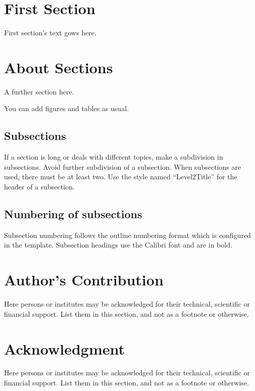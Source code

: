 \documentclass[article]{imeko_acta}
\begin{document}
\section{First Section}

First section's text gows here.

\section{About Sections}

A further section here.

You can add figures and tables as usual.


	

\subsection{Subsections} \label{sec:sub1}

If a section is long or deals with different topics, make a subdivision in subsections. Avoid further subdivision of a subsection. When subsections are used, there must be at least two. Use the style named ``Level2Title'' for the header of a subsection.

\subsection{Numbering of subsections}

Subsection numbering follows the outline numbering format which is configured in the template. Subsection headings use the Calibri font and are in bold.

\section*{Author's Contribution}

Here persons or institutes may be acknowledged for their technical, scientific or financial support. List them in this section, and not as a footnote or otherwise.

\section*{Acknowledgment} 

Here persons or institutes may be acknowledged for their technical, scientific or financial support. List them in this section, and not as a footnote or otherwise.

\nocite{*}


\end{document}
